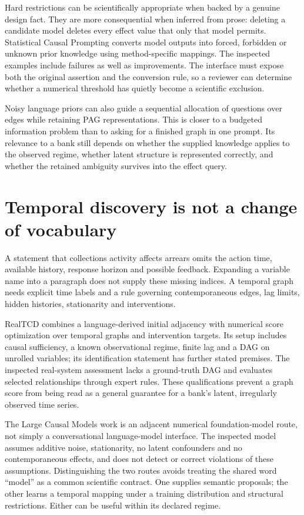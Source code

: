 Hard restrictions can be scientifically appropriate when backed by a genuine
design fact. They are more consequential when inferred from prose: deleting a
candidate model deletes every effect value that only that model permits.
Statistical Causal Prompting converts model outputs into forced, forbidden or
unknown prior knowledge using method-specific mappings. The inspected examples
include failures as well as improvements. \cite{v12_la_2402_01454} The interface
must expose both the original assertion and the conversion rule, so a reviewer
can determine whether a numerical threshold has quietly become a scientific
exclusion.

Noisy language priors can also guide a sequential allocation of questions over
edges while retaining PAG representations. \cite{v12_la_2506_16234} This is closer
to a budgeted information problem than to asking for a finished graph in one
prompt. Its relevance to a bank still depends on whether the supplied knowledge
applies to the observed regime, whether latent structure is represented
correctly, and whether the retained ambiguity survives into the effect query.

\section{Temporal discovery is not a change of vocabulary}

A statement that collections activity affects arrears omits the action time,
available history, response horizon and possible feedback. Expanding a variable
name into a paragraph does not supply these missing indices. A temporal graph
needs explicit time labels and a rule governing contemporaneous edges, lag
limits, hidden histories, stationarity and interventions.

RealTCD combines a language-derived initial adjacency with numerical score
optimization over temporal graphs and intervention targets. Its setup includes
causal sufficiency, a known observational regime, finite lag and a DAG on
unrolled variables; its identification statement has further stated premises.
The inspected real-system assessment lacks a ground-truth DAG and evaluates
selected relationships through expert rules. \cite{v12_la_2404_14786} These
qualifications prevent a graph score from being read as a general guarantee
for a bank's latent, irregularly observed time series.

The Large Causal Models work is an adjacent numerical foundation-model route,
not simply a conversational language-model interface. The inspected model
assumes additive noise, stationarity, no latent confounders and no
contemporaneous effects, and does not detect or correct violations of these
assumptions. \cite{v12_la_2602_18662} Distinguishing the two routes avoids treating
the shared word ``model'' as a common scientific contract. One supplies semantic
proposals; the other learns a temporal mapping under a training distribution
and structural restrictions. Either can be useful within its declared regime.

